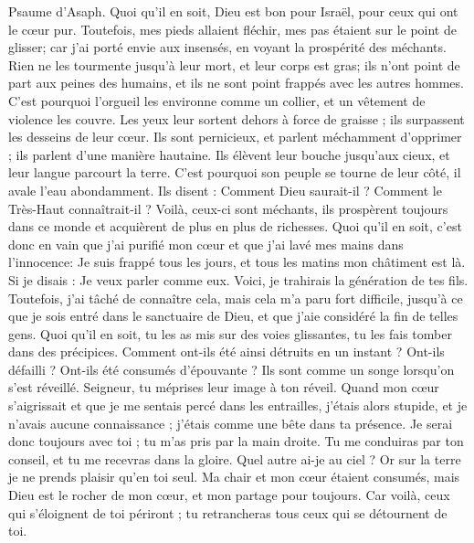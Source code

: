 \begin{multicols}{2}
\VerseOne{}Psaume d'Asaph. Quoi qu'il en soit, Dieu est bon pour Israël, pour ceux qui ont le cœur pur.
Toutefois, mes pieds allaient fléchir, mes pas étaient sur le point de glisser;
car j'ai porté envie aux insensés, en voyant la prospérité des méchants.
Rien ne les tourmente jusqu'à leur mort, et leur corps est gras;
ils n'ont point de part aux peines des humains, et ils ne sont point frappés avec les autres hommes.
C'est pourquoi l'orgueil les environne comme un collier, et un vêtement de violence les couvre.
Les yeux leur sortent dehors à force de graisse ; ils surpassent les desseins de leur cœur.
Ils sont pernicieux, et parlent méchamment d'opprimer ; ils parlent d'une manière hautaine.
Ils élèvent leur bouche jusqu'aux cieux, et leur langue parcourt la terre.
C'est pourquoi son peuple se tourne de leur côté, il avale l'eau abondamment.
Ils disent : Comment Dieu saurait-il ? Comment le Très-Haut connaîtrait-il ?
Voilà, ceux-ci sont méchants, ils prospèrent toujours dans ce monde et acquièrent de plus en plus de richesses.
Quoi qu'il en soit, c'est donc en vain que j'ai purifié mon cœur et que j'ai lavé mes mains dans l'innocence:
Je suis frappé tous les jours, et tous les matins mon châtiment est là.
Si je disais : Je veux parler comme eux. Voici, je trahirais la génération de tes fils.
Toutefois, j'ai tâché de connaître cela, mais cela m'a paru fort difficile,
jusqu'à ce que je sois entré dans le sanctuaire de Dieu, et que j'aie considéré la fin de telles gens.
Quoi qu'il en soit, tu les as mis sur des voies glissantes, tu les fais tomber dans des précipices.
Comment ont-ils été ainsi détruits en un instant ? Ont-ils défailli ? Ont-ils été consumés d'épouvante ?
Ils sont comme un songe lorsqu'on s'est réveillé. Seigneur, tu méprises leur image à ton réveil.
Quand mon cœur s'aigrissait et que je me sentais percé dans les entrailles,
j'étais alors stupide, et je n'avais aucune connaissance ; j'étais comme une bête dans ta présence.
Je serai donc toujours avec toi ; tu m'as pris par la main droite.
Tu me conduiras par ton conseil, et tu me recevras dans la gloire.
Quel autre ai-je au ciel ? Or sur la terre je ne prends plaisir qu'en toi seul.
Ma chair et mon cœur étaient consumés, mais Dieu est le rocher de mon cœur, et mon partage pour toujours.
Car voilà, ceux qui s'éloignent de toi périront ; tu retrancheras tous ceux qui se détournent de toi.

\end{multicols}
